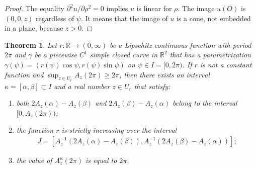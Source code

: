 \documentclass{amsart}
\theoremstyle{plain}
\newtheorem{theorem}{Theorem}[section]
\theoremstyle{definition}
\theoremstyle{remark}
\begin{document}
\begin{proof}%
The equality $\partial^2u/\partial\rho^2=0$ implies $u$ is linear for $\rho$.
The image $u(O)$ is $(0,0,z)$ regardless of $\psi$.
It means that the image of $u$ is a cone, not embedded in a plane, because $z>0$. 
\end{proof}







\begin{theorem}\label{4.3} %
Let $r \colon \mathbb{R}\to(0,\infty)$ be a Lipschitz continuous function with period $2\pi$ and $\gamma$ be a piecewise $C^1$ simple closed curve in $\mathbb{R}^2$ that has a parametrization $\gamma(\psi)=(r(\psi)\cos\psi,r(\psi)\sin\psi)$ on $\psi\in I=[0,2\pi)$. 
If $r$ is not a constant function and $\sup_{z\in U_r}A_z(2\pi)\ge2\pi$, then there exists an interval $\kappa=[\alpha,\beta]\subset I$ and a real number $z\in U_r$ that satisfy:
\begin{enumerate}
\item both $2A_z(\alpha)-A_z(\beta)$ and $2A_z(\beta)-A_z(\alpha)$ belong to the interval $[0,A_z(2\pi))$;
\item the function $r$ is strictly increasing over the interval 
\begin{align*} 
J=[A_z^{-1}(2A_z(\alpha)-A_z(\beta)),A_z^{-1}(2A_z(\beta)-A_z(\alpha))];
\end{align*} 
\item the value of $A_z^{\kappa}(2\pi)$ is equal to $2\pi$.
\end{enumerate}
\end{theorem}
\end{document}

